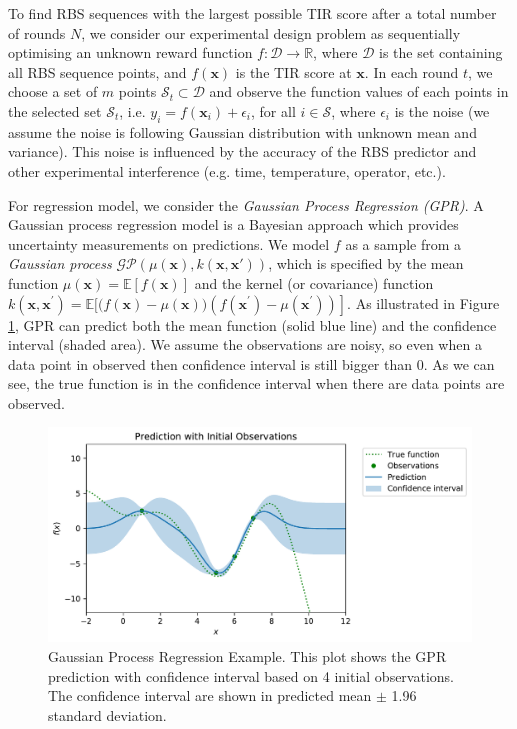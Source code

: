 To find RBS sequences with the largest possible TIR score after a total number of rounds $N$,  we consider our experimental design problem as sequentially optimising an unknown reward function $f: \mathcal{D} \rightarrow \mathbb{R}$, where $\mathcal{D}$ is the set containing all RBS sequence points, and $f(\mathbf{x})$ is the TIR score at $\mathbf{x}$. 
In each round $t$, we choose a set of $m$ points $\mathcal{S}_t \subset \mathcal{D}$ and observe the function values of each points in the selected set $\mathcal{S}_t$, i.e. $y_i = f(\mathbf{x}_i) + \epsilon_i$, for all $i \in \mathcal{S}$, where $\epsilon_i$ is the noise (we assume the noise is following Gaussian distribution with unknown mean and variance). This noise is influenced by the accuracy of the RBS predictor and other experimental interference (e.g. time, temperature, operator, etc.). 

For regression model, we consider the \textit{Gaussian Process Regression (GPR)}.
A Gaussian process regression model \cite{Rasmussen2004} is a Bayesian approach which provides uncertainty measurements on predictions. 
We model $f$ as a sample from a \textit{Gaussian process} $\mathcal{G} \mathcal{P}(\mu(\mathbf{x}), k(\mathbf{x}, \mathbf{x'}))$, which is specified by the mean function $\mu(\mathbf{x})=\mathbb{E}[f(\mathbf{x})]$ and the kernel (or covariance) function $k\left(\mathbf{x}, \mathbf{x}^{\prime}\right)=\mathbb{E}[(f(\mathbf{x})-\left.\mu(\mathbf{x}))\left(f\left(\mathbf{x}^{\prime}\right)-\mu\left(\mathbf{x}^{\prime}\right)\right)\right]$.
As illustrated in Figure \ref{fig: Gaussian Process Regression Example.}, GPR can predict both the mean function (solid blue line) and the confidence interval (shaded area). 
We assume the observations are noisy, so even when a data point in observed then confidence interval is still bigger than 0. 
As we can see, the true function is in the confidence interval when there are data points are observed. 

\begin{figure}[t]
    \centering
    \includegraphics[scale=0.7]{plots/Prediction with Initial Observations.pdf}
    \caption{Gaussian Process Regression Example. This plot shows the GPR prediction with confidence interval based on 4 initial observations. The confidence interval are shown in predicted mean $\pm$ 1.96 standard deviation.}
    \label{fig: Gaussian Process Regression Example.}
\end{figure}


